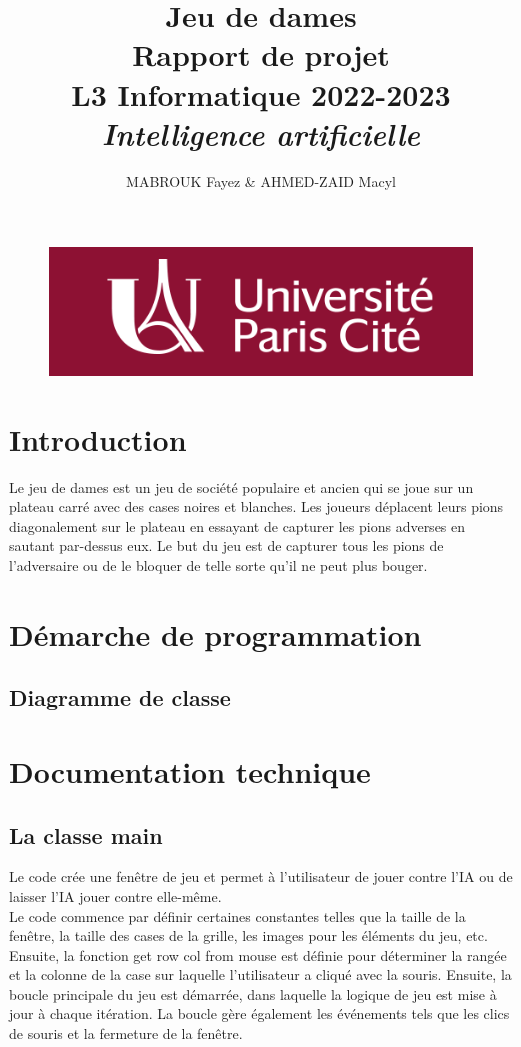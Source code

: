 \documentclass[12pt]{article}
\author{MABROUK Fayez \& AHMED-ZAID Macyl}
\title{{\bf Jeu de dames} \\
	Rapport de projet \\
	{\small L3 Informatique 2022-2023} \\
	{\it \small  Intelligence artificielle}}
\begin{document}
	
	
	\maketitle
		\begin{figure}[!hbtp]
		\centering
		\includegraphics[scale=0.5]{ACTU-UPC.png}
		
	\end{figure}
	
	\newpage
	\tableofcontents
	\newpage
	\section{Introduction}
	Le jeu de dames est un jeu de société populaire et ancien qui se joue sur un plateau carré avec des cases noires et blanches. Les joueurs déplacent leurs pions diagonalement sur le plateau en essayant de capturer les pions adverses en sautant par-dessus eux. Le but du jeu est de capturer tous les pions de l'adversaire ou de le bloquer de telle sorte qu'il ne peut plus bouger. 
	\section{Démarche de programmation}
	\subsection{Diagramme de classe}
	\section{Documentation technique}
	\subsection{La classe main}
	Le code crée une fenêtre de jeu et permet à l'utilisateur de jouer contre l'IA ou de laisser l'IA jouer contre elle-même.\\
	Le code commence par définir certaines constantes telles que la taille de la fenêtre, la taille des cases de la grille, les images pour les éléments du jeu, etc. Ensuite, la fonction get row col from mouse  est définie pour déterminer la rangée et la colonne de la case sur laquelle l'utilisateur a cliqué avec la souris. Ensuite, la boucle principale du jeu est démarrée, dans laquelle la logique de jeu est mise à jour à chaque itération. La boucle gère également les événements tels que les clics de souris et la fermeture de la fenêtre.
\end{document}
